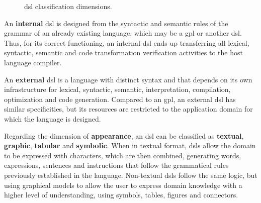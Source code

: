 \begin{figure}[!htb]
    \centering
    \caption{dsl classification dimensions.}
    
    \label{fig:dsl}
\end{figure}

An \textbf{internal} \ac{dsl} is designed from the syntactic and semantic rules of the grammar of an already existing language, which may be a \ac{gpl} or another \ac{dsl}.
Thus, for its correct functioning, an internal \ac{dsl} ends up transferring all lexical, syntactic, semantic and code transformation verification activities to the host language compiler.

An \textbf{external} \ac{dsl} is a language with distinct syntax and that depends on its own infrastructure for lexical, syntactic, semantic, interpretation, compilation, optimization and code generation.
Compared to an \ac{gpl}, an external \ac{dsl} has similar specificities, but its resources are restricted to the application domain for which the language is designed.

Regarding the dimension of \textbf{appearance}, an \ac{dsl} can be classified as \textbf{textual}, \textbf{graphic}, \textbf{tabular} and \textbf{symbolic}.
When in textual format, \acp{dsl} allow the domain to be expressed with characters, which are then combined, generating words, expressions, sentences and instructions that follow the grammatical rules previously established in the language.
Non-textual \acp{dsl} follow the same logic, but using graphical models to allow the user to express domain knowledge with a higher level of understanding, using symbols, tables, figures and connectors.

